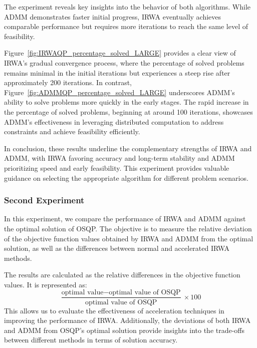 \documentclass{article}
\begin{document}
The experiment reveals key insights into the behavior of both algorithms. While ADMM demonstrates faster initial progress, IRWA eventually achieves comparable performance but requires more iterations to reach the same level of feasibility.

Figure~\ref{fig:IRWAQP_percentage_solved_LARGE} provides a clear view of IRWA’s gradual convergence process, where the percentage of solved problems remains minimal in the initial iterations but experiences a steep rise after approximately 200 iterations. In contrast,
Figure~\ref{fig:ADMMQP_percentage_solved_LARGE} underscores ADMM's ability to solve problems more quickly in the early stages. The rapid increase in the percentage of solved problems, beginning at around 100 iterations, showcases ADMM's effectiveness in leveraging distributed computation to address constraints and achieve feasibility efficiently.

In conclusion, these results underline the complementary strengths of IRWA and ADMM, with IRWA favoring accuracy and long-term stability and ADMM prioritizing speed and early feasibility. This experiment provides valuable guidance on selecting the appropriate algorithm for different problem scenarios.

\subsubsection{Second Experiment}
In this experiment, we compare the performance of IRWA and ADMM against the optimal solution of OSQP. The objective is to measure the relative deviation of the objective function values obtained by IRWA and ADMM from the optimal solution, as well as the differences between normal and accelerated IRWA methods. 

The results are calculated as the relative differences in the objective function values. It is represented as:
\[
\frac{\text{optimal value} - \text{optimal value of OSQP}}{\text{optimal value of OSQP}} \times 100
\]
This allows us to evaluate the effectiveness of acceleration techniques in improving the performance of IRWA. Additionally, the deviations of both IRWA and ADMM from OSQP's optimal solution provide insights into the trade-offs between different methods in terms of solution accuracy.
\end{document}

